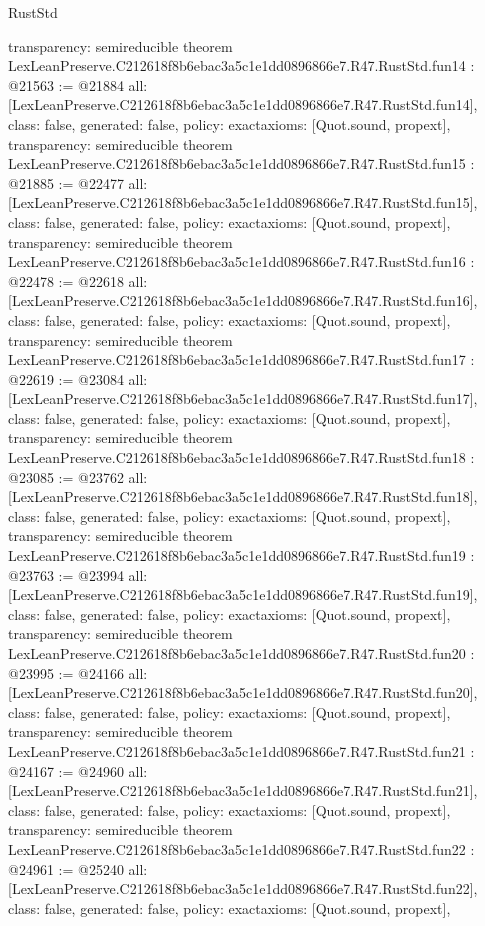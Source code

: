 \begin{lexlean}{RustStd}
\begin{coremodule}
{  transparency: semireducible
}
theorem LexLeanPreserve.C212618f8b6ebac3a5c1e1dd0896866e7.R47.RustStd.fun14 : @21563 := @21884 {
  all: [LexLeanPreserve.C212618f8b6ebac3a5c1e1dd0896866e7.R47.RustStd.fun14],
  class: false,
  generated: false,
  policy: exact{axioms: [Quot.sound, propext]},
  transparency: semireducible
}
theorem LexLeanPreserve.C212618f8b6ebac3a5c1e1dd0896866e7.R47.RustStd.fun15 : @21885 := @22477 {
  all: [LexLeanPreserve.C212618f8b6ebac3a5c1e1dd0896866e7.R47.RustStd.fun15],
  class: false,
  generated: false,
  policy: exact{axioms: [Quot.sound, propext]},
  transparency: semireducible
}
theorem LexLeanPreserve.C212618f8b6ebac3a5c1e1dd0896866e7.R47.RustStd.fun16 : @22478 := @22618 {
  all: [LexLeanPreserve.C212618f8b6ebac3a5c1e1dd0896866e7.R47.RustStd.fun16],
  class: false,
  generated: false,
  policy: exact{axioms: [Quot.sound, propext]},
  transparency: semireducible
}
theorem LexLeanPreserve.C212618f8b6ebac3a5c1e1dd0896866e7.R47.RustStd.fun17 : @22619 := @23084 {
  all: [LexLeanPreserve.C212618f8b6ebac3a5c1e1dd0896866e7.R47.RustStd.fun17],
  class: false,
  generated: false,
  policy: exact{axioms: [Quot.sound, propext]},
  transparency: semireducible
}
theorem LexLeanPreserve.C212618f8b6ebac3a5c1e1dd0896866e7.R47.RustStd.fun18 : @23085 := @23762 {
  all: [LexLeanPreserve.C212618f8b6ebac3a5c1e1dd0896866e7.R47.RustStd.fun18],
  class: false,
  generated: false,
  policy: exact{axioms: [Quot.sound, propext]},
  transparency: semireducible
}
theorem LexLeanPreserve.C212618f8b6ebac3a5c1e1dd0896866e7.R47.RustStd.fun19 : @23763 := @23994 {
  all: [LexLeanPreserve.C212618f8b6ebac3a5c1e1dd0896866e7.R47.RustStd.fun19],
  class: false,
  generated: false,
  policy: exact{axioms: [Quot.sound, propext]},
  transparency: semireducible
}
theorem LexLeanPreserve.C212618f8b6ebac3a5c1e1dd0896866e7.R47.RustStd.fun20 : @23995 := @24166 {
  all: [LexLeanPreserve.C212618f8b6ebac3a5c1e1dd0896866e7.R47.RustStd.fun20],
  class: false,
  generated: false,
  policy: exact{axioms: [Quot.sound, propext]},
  transparency: semireducible
}
theorem LexLeanPreserve.C212618f8b6ebac3a5c1e1dd0896866e7.R47.RustStd.fun21 : @24167 := @24960 {
  all: [LexLeanPreserve.C212618f8b6ebac3a5c1e1dd0896866e7.R47.RustStd.fun21],
  class: false,
  generated: false,
  policy: exact{axioms: [Quot.sound, propext]},
  transparency: semireducible
}
theorem LexLeanPreserve.C212618f8b6ebac3a5c1e1dd0896866e7.R47.RustStd.fun22 : @24961 := @25240 {
  all: [LexLeanPreserve.C212618f8b6ebac3a5c1e1dd0896866e7.R47.RustStd.fun22],
  class: false,
  generated: false,
  policy: exact{axioms: [Quot.sound, propext]},
}
\end{coremodule}
\end{lexlean}
